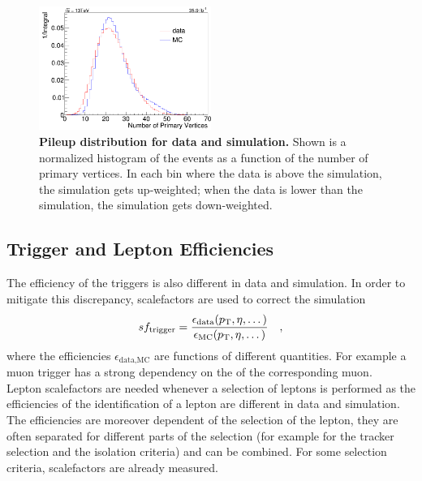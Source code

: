 \begin{figure}
\centering
\includegraphics[width=0.5\textwidth]{assets/pup.png}
\caption[Pileup Distributions for Data and Simulation]{\textbf{Pileup distribution for data and simulation.} Shown is a normalized histogram of the events as a function of the number of primary vertices. In each bin where the data is above the simulation, the simulation gets up-weighted; when the data is lower than the simulation, the simulation gets down-weighted.}
\label{fig:ch_3_pup}
\end{figure}

\subsection{Trigger and Lepton Efficiencies}
The efficiency of the triggers is also different in data and simulation. In order to mitigate this discrepancy, scalefactors are used to correct the simulation
\begin{equation}
sf_\textrm{trigger} = \frac{\epsilon_\textrm{data}(p_\mathrm{T},\eta,\dots)}{\epsilon_\textrm{MC}(p_\mathrm{T},\eta,\dots)} \quad ,
\end{equation}
where the efficiencies $\epsilon_\textrm{data,MC}$ are functions of different quantities. For example a muon trigger has a strong dependency on the \pt of the corresponding muon. \\

Lepton scalefactors are needed whenever a selection of leptons is performed as the efficiencies of the identification of a lepton are different in data and simulation. The efficiencies are moreover dependent of the selection of the lepton, they are often separated for different parts of the selection (for example for the tracker selection and the isolation criteria) and can be combined. For some selection criteria, scalefactors are already measured.




